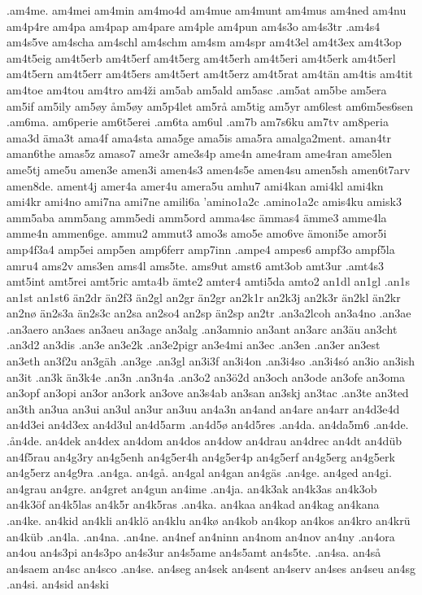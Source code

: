 .am4me.
am4mei
am4min
am4mo4d
am4mue
am4munt
am4mus
am4ned
am4nu
am4p4re
am4pa
am4pap
am4pare
am4ple
am4pun
am4s3o
am4s3tr
.am4s4
am4s5ve
am4scha
am4schl
am4schm
am4sm
am4spr
am4t3el
am4t3ex
am4t3op
am4t5eig
am4t5erb
am4t5erf
am4t5erg
am4t5erh
am4t5eri
am4t5erk
am4t5erl
am4t5ern
am4t5err
am4t5ers
am4t5ert
am4t5erz
am4t5rat
am4tän
am4tis
am4tit
am4toe
am4tou
am4tro
am4ži
am5ab
am5ald
am5asc
.am5at
am5be
am5era
am5if
am5ily
am5øy
åm5øy
am5p4let
am5rå
am5tig
am5yr
am6lest
am6m5es6sen
.am6ma.
am6perie
am6t5erei
.am6ta
am6ul
.am7b
am7s6ku
am7tv
am8peria
ama3d
äma3t
ama4f
ama4sta
ama5ge
ama5is
ama5ra
amalga2ment.
aman4tr
aman6the
amas5z
amaso7
ame3r
ame3s4p
ame4n
ame4ram
ame4ran
ame5len
ame5tj
ame5u
amen3e
amen3i
amen4s3
amen4s5e
amen4su
amen5sh
amen6t7arv
amen8de.
ament4j
amer4a
amer4u
amera5u
amhu7
ami4kan
ami4kl
ami4kn
ami4kr
ami4no
ami7na
ami7ne
amili6a
'amino1a2c
.amino1a2c
amis4ku
amisk3
amm5aba
amm5ang
amm5edi
amm5ord
amma4sc
ämmas4
ämme3
amme4la
amme4n
ammen6ge.
ammu2
ammut3
amo3s
amo5e
amo6ve
ämoni5e
amor5i
amp4f3a4
amp5ei
amp5en
amp6ferr
amp7inn
.ampe4
ampes6
ampf3o
ampf5la
amru4
ams2v
ams3en
ams4l
ams5te.
ams9ut
amst6
amt3ob
amt3ur
.amt4s3
amt5int
amt5rei
amt5ric
amta4b
ämte2
amter4
amti5da
amto2
an1dl
an1gl
.an1s
an1st
an1st6
än2dr
än2f3
än2gl
an2gr
än2gr
an2k1r
an2k3j
an2k3r
än2kl
än2kr
an2nø
än2s3a
än2s3c
an2sa
an2so4
an2sp
än2sp
an2tr
.an3a2lcoh
an3a4no
.an3ae
.an3aero
an3aes
an3aeu
an3age
an3alg
.an3amnio
an3ant
an3arc
an3äu
an3cht
.an3d2
an3dis
.an3e
an3e2k
.an3e2pigr
an3e4mi
an3ec
.an3en
.an3er
an3est
an3eth
an3f2u
an3gäh
.an3ge
.an3gl
an3i3f
an3i4on
.an3i4so
.an3i4só
an3io
an3ish
an3it
.an3k
än3k4e
.an3n
.an3n4a
.an3o2
an3ö2d
an3och
an3ode
an3ofe
an3oma
an3opf
an3opi
an3or
an3ork
an3ove
an3s4ab
an3san
an3skj
an3tac
.an3te
an3ted
an3th
an3ua
an3ui
an3ul
an3ur
an3uu
an4a3n
an4and
an4are
an4arr
an4d3e4d
an4d3ei
an4d3ex
an4d3ul
an4d5arm
.an4d5ø
an4d5res
.an4da.
an4da5m6
.an4de.
.ån4de.
an4dek
an4dex
an4dom
an4dos
an4dow
an4drau
an4drec
an4dt
an4düb
an4f5rau
an4g3ry
an4g5enh
an4g5er4h
an4g5er4p
an4g5erf
an4g5erg
an4g5erk
an4g5erz
an4g9ra
.an4ga.
an4gå.
an4gal
an4gan
an4gäs
.an4ge.
an4ged
an4gi.
an4grau
an4gre.
an4gret
an4gun
an4ime
.an4ja.
an4k3ak
an4k3as
an4k3ob
an4k3öf
an4k5las
an4k5r
an4k5ras
.an4ka.
an4kaa
an4kad
an4kag
an4kana
.an4ke.
an4kid
an4kli
an4klö
an4klu
an4kø
an4kob
an4kop
an4kos
an4kro
an4krü
an4küb
.an4la.
.an4na.
.an4ne.
an4nef
an4ninn
an4nom
an4nov
an4ny
.an4ora
an4ou
an4s3pi
an4s3po
an4s3ur
an4s5ame
an4s5amt
an4s5te.
.an4sa.
an4så
an4saem
an4sc
an4sco
.an4se.
an4seg
an4sek
an4sent
an4serv
an4ses
an4seu
an4sg
.an4si.
an4sid
an4ski

